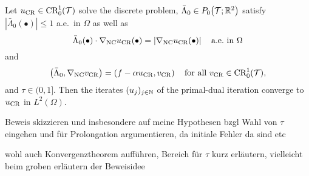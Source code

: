\begin{frame}
  \begin{theorem}
    Let $u_\textup{CR}\in \textup{CR}^1_0(\mathcal{T})$ solve the discrete problem,
    $\bar\Lambda_0\in P_0\!\left(\mathcal{T};\mathbb{R}^2\right)$ satisfy
    $\left|\bar\Lambda_0(\bullet)\right|\leq 1$ a.e.\ in $\Omega$ as well as
    \begin{equation*}
      \bar\Lambda_0(\bullet)\cdot\nabla_\textup{NC}u_\textup{CR}(\bullet)
      =
      \left|\nabla_\textup{NC}u_\textup{CR}(\bullet)\right| 
      \quad\text{a.e.\ in } \Omega 
    \end{equation*}
    and
    \begin{equation*}
      \left(\bar\Lambda_0,\nabla_\textup{NC}v_\textup{CR}\right)
      = \left(f-\alpha u_\textup{CR},
      v_\textup{CR}\right)
      \quad\text{for all } v_\textup{CR}\in\textup{CR}^1_0(\mathcal{T}),
    \end{equation*}
    and $\tau \in (0, 1]$.
    Then the iterates $(u_j)_{j\in\mathbb{N}}$ of
    the primal-dual iteration converge to $u_\textup{CR}$ in $L^2(\Omega)$.
  \end{theorem}
\end{frame}

\begin{frame}
  Beweis skizzieren und insbesondere auf meine Hypothesen bzgl Wahl von $\tau$
  eingehen und für Prolongation argumentieren, da initiale Fehler da sind etc

  wohl auch Konvergenztheorem aufführen, Bereich für $\tau$ kurz erläutern,
  vielleicht beim groben erläutern der Beweisidee
\end{frame}


